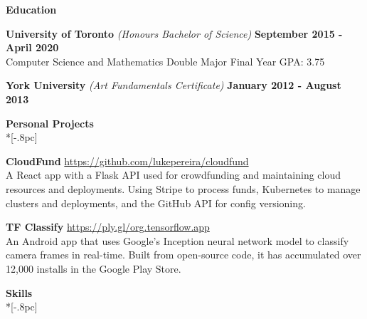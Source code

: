 \documentclass{article}
\begin{document}
\vspace{4pt}
{\large \bf Education} \\[-.8pc]
\underline{\hspace{7in}} 

{\bf University of Toronto} {\textit{(Honours Bachelor of Science)}} \hfill {\bf September 2015 - April 2020} \\[.2pc]
Computer Science and Mathematics Double Major  \hfill {Final Year GPA: 3.75}

{\bf York University} {\textit{(Art Fundamentals Certificate)}} \hfill {\bf January 2012 - August 2013 \/} 

\vspace{4pt}
{\large \bf Personal Projects} \\*[-.8pc]
\underline{\hspace{7in}}

\textbf{CloudFund} \hfill \url{https://github.com/lukepereira/cloudfund}\\
A React app with a Flask API used for crowdfunding and maintaining cloud resources and deployments. Using Stripe to process funds, Kubernetes to manage clusters and deployments, and the GitHub API for config versioning.

\textbf{TF Classify} \hfill \url{https://ply.gl/org.tensorflow.app}\\
An Android app that uses Google’s Inception neural network model to classify camera frames in real-time. Built from open-source code, it has accumulated over 12,000 installs in the Google Play Store.

\vspace{4pt}
{\large \bf Skills} \\*[-.8pc]
\underline{\hspace{7in}}
\end{document}
